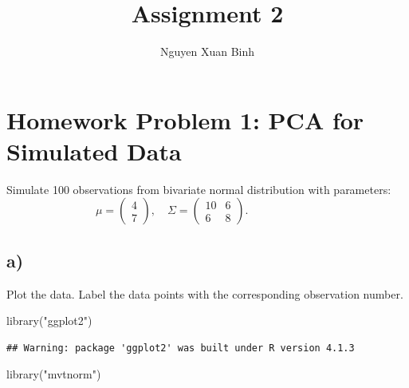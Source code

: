 \documentclass[
]{article}
\title{Assignment 2}
\author{Nguyen Xuan Binh}
\date{}
\newenvironment{Shaded}{\begin{snugshade}}{\end{snugshade}}
\newcommand{\FunctionTok}[1]{\textcolor[rgb]{0.00,0.00,0.00}{#1}}
\newcommand{\NormalTok}[1]{#1}
\newcommand{\StringTok}[1]{\textcolor[rgb]{0.31,0.60,0.02}{#1}}
\begin{document}
\maketitle

\hypertarget{homework-problem-1-pca-for-simulated-data}{%
\section{Homework Problem 1: PCA for Simulated
Data}\label{homework-problem-1-pca-for-simulated-data}}

Simulate 100 observations from bivariate normal distribution with
parameters:\\

\(\quad\quad\quad\quad\quad\quad\quad\quad\mu=\begin{pmatrix} 4\\7\end{pmatrix}, \quad \Sigma=\begin{pmatrix}10 & 6\\6 & 8\end{pmatrix}.\)

\hypertarget{a}{%
\subsection{a)}\label{a}}

Plot the data. Label the data points with the corresponding observation
number.

\begin{Shaded}
\begin{Highlighting}[]
\FunctionTok{library}\NormalTok{(}\StringTok{"ggplot2"}\NormalTok{)}
\end{Highlighting}
\end{Shaded}

\begin{verbatim}
## Warning: package 'ggplot2' was built under R version 4.1.3
\end{verbatim}

\begin{Shaded}
\begin{Highlighting}[]
\FunctionTok{library}\NormalTok{(}\StringTok{"mvtnorm"}\NormalTok{)}
\end{Highlighting}
\end{Shaded}
\end{document}
